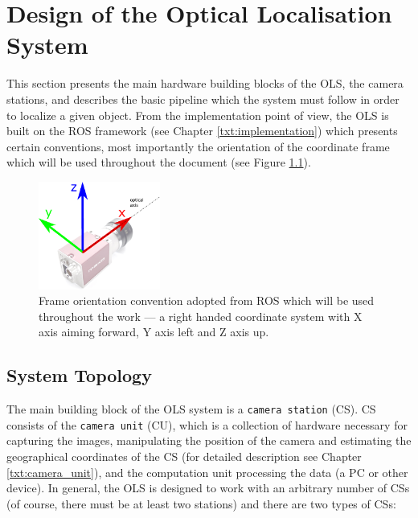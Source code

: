 \chapter{Design of the Optical Localisation System} \label{txt:system_overview}

This section presents the main hardware building blocks of the OLS, the camera stations, and describes the basic pipeline which the system must follow in order to localize a given object. From the implementation point of view, the OLS is built on the ROS framework (see Chapter \ref{txt:implementation}) which presents certain conventions, most importantly the orientation of the coordinate frame which will be used throughout the document (see Figure \ref{fig:frame_convention}).

\begin{figure}[htb]
	\centering
	\includegraphics[width=4cm]{fig/frame_convention.pdf}
	\caption{Frame orientation convention adopted from ROS which will be used throughout the work --- a right handed coordinate system with X axis aiming forward, Y axis left and Z axis up.}
	\label{fig:frame_convention}
\end{figure}


\section{System Topology}

The main building block of the OLS system is a \texttt{camera station} (CS). CS consists of the \texttt{camera unit} (CU), which is a collection of hardware necessary for capturing the images, manipulating the position of the camera and estimating the geographical coordinates of the CS (for detailed description see Chapter \ref{txt:camera_unit}), and the computation unit processing the data (a PC or other device). In general, the OLS is designed to work with an arbitrary number of CSs (of course, there must be at least two stations) and there are two types of CSs:

